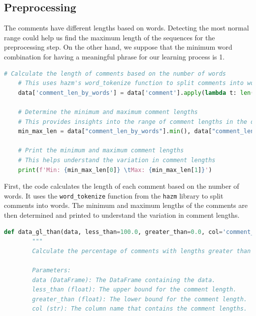 \documentclass{solutionclass} %
\begin{document}
\begin{solution}
    \subsection*{Preprocessing}

    The comments have different lengths based on words. Detecting the most normal range could help us find the maximum length of the sequences for the preprocessing step. On the other hand, we suppose that the minimum word combination for having a meaningful phrase for our learning process is 1.
    
    \begin{lstlisting}[language=Python, basicstyle=\ttfamily\footnotesize, keywordstyle=\color{blue}, commentstyle=\color{gray}]
    # Calculate the length of comments based on the number of words
    # This uses hazm's word_tokenize function to split comments into words and then counts the number of words
    data['comment_len_by_words'] = data['comment'].apply(lambda t: len(hazm.word_tokenize(t)))
    
    # Determine the minimum and maximum comment lengths
    # This provides insights into the range of comment lengths in the dataset
    min_max_len = data["comment_len_by_words"].min(), data["comment_len_by_words"].max()
    
    # Print the minimum and maximum comment lengths
    # This helps understand the variation in comment lengths
    print(f'Min: {min_max_len[0]} \tMax: {min_max_len[1]}')
    \end{lstlisting}
    
    First, the code calculates the length of each comment based on the number of words. It uses the \texttt{word\_tokenize} function from the \texttt{hazm} library to split comments into words. The minimum and maximum lengths of the comments are then determined and printed to understand the variation in comment lengths.
    
    \begin{lstlisting}[language=Python, basicstyle=\ttfamily\footnotesize, keywordstyle=\color{blue}, commentstyle=\color{gray}]
    def data_gl_than(data, less_than=100.0, greater_than=0.0, col='comment_len_by_words'):
        """
        Calculate the percentage of comments with lengths greater than 'greater_than' and less than or equal to 'less_than'.
    
        Parameters:
        data (DataFrame): The DataFrame containing the data.
        less_than (float): The upper bound for the comment length.
        greater_than (float): The lower bound for the comment length.
        col (str): The column name that contains the comment lengths.
    

\end{lstlisting}
\end{solution}
\end{document}
